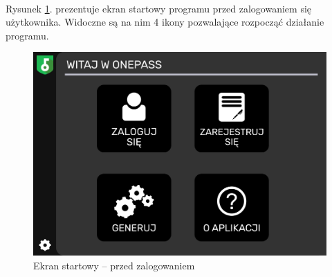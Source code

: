 \documentclass[a4paper]{article}
\begin{document}
\paragraph{}Rysunek \ref{fig:startPrzed}. prezentuje ekran startowy programu przed zalogowaniem się użytkownika. Widoczne są na nim 4 ikony pozwalające rozpocząć działanie programu.
\begin{figure}[H]
    \centering
    \includegraphics[width=1\textwidth]{img/ekran_przed_zalogowaniem.png}
    \caption{Ekran startowy -- przed zalogowaniem}
    \label{fig:startPrzed}
\end{figure}

\newpage
\end{document}
